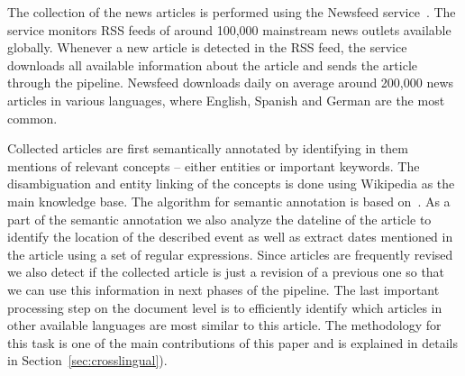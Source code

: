 \documentclass[twoside,11pt]{article}
\begin{document}
The collection of the news articles is performed using the Newsfeed service~\cite{Trampus2012}. The service monitors RSS feeds of around 100,000 mainstream news outlets available globally. Whenever a new article is detected in the RSS feed, the service downloads all available information about the article and sends the article through the pipeline. Newsfeed downloads daily on average around 200,000 news articles in various languages, where English, Spanish and German are the most common.

Collected articles are first semantically annotated by identifying in them mentions of relevant concepts -- either entities or important keywords. The disambiguation and entity linking of the concepts is done using Wikipedia as the main knowledge base. The algorithm for semantic annotation is based on~\cite{zhang2014saaacamactat}. As a part of the semantic annotation we also analyze the dateline of the article to identify the location of the described event as well as extract dates mentioned in the article using a set of regular expressions. Since articles are frequently revised we also detect if the collected article is just a revision of a previous one so that we can use this information in next phases of the pipeline. The last important processing step on the document level is to efficiently identify which articles in other available languages are most similar to this article. The methodology for this task is one of the main contributions of this paper and is explained in details in Section~\ref{sec:crosslingual}).
\end{document}
